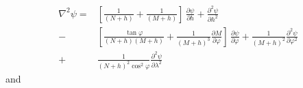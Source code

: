 \documentclass[mreferee]{gji}
\begin{document}
\begin{equation} \label{eq:Laplacian-geodetic}
\begin{split}
\nabla^{2} \psi = 
& \left[ \frac{1}{\left( N + h \right)} + \frac{1}{\left( M + h \right)} \right] \, \frac{\partial \psi}{\partial h} + 
\frac{\partial^{2} \psi}{\partial h^{2}} \\
- & \left[ \frac{\tan \varphi}{\left( N + h \right) \left( M + h \right)} + \frac{1}{\left( M + h \right)^{3}} \frac{\partial M}{\partial \varphi} \right] \,
\frac{\partial \psi}{\partial \varphi} + \frac{1}{\left( M + h \right)^{2}} \frac{\partial^{2} \psi}{\partial \varphi^{2}} \\
+ & \frac{1}{\left( N + h \right)^{2} \cos^{2} \varphi} \frac{\partial^{2} \psi}{\partial \lambda^{2}}
\end{split}
\end{equation}
and
\end{document}
